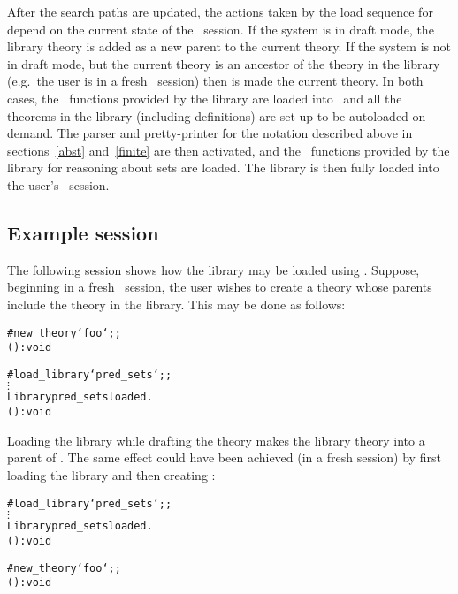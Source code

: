 After the search paths are updated, the actions taken by the load sequence for
 depend on the current state of the \HOL\ session. If the system
is in draft mode, the library theory  is added as a new parent
to the current theory.  If the system is not in draft mode, but the current
theory is an ancestor of the  theory in the library (e.g.\ the
user is in a fresh \HOL\ session) then  is made the current
theory.  In both cases, the \ML\ functions provided by the library are loaded
into \HOL\, and all the theorems in the library (including definitions) are set
up to be autoloaded on demand.  The parser and pretty-printer for the notation
described above in sections~\ref{abst} and~\ref{finite} are then activated, and
the \ML\ functions provided by the library for reasoning about sets are loaded.
The  library is then fully loaded into the user's \HOL\ session.

\subsection{Example session}

The following session shows how the  library may be loaded using
. Suppose, beginning in a fresh \HOL\ session, the user
wishes to create a theory  whose parents include the theory
 in the library. This may be done as follows:

\setcounter{sessioncount}{1}
\begin{session}\begin{alltt}
#new_theory `foo`;;
() : void

#load_library `pred_sets`;;
  \(\vdots\)
Library pred_sets loaded.
() : void
\end{alltt}\end{session}

\noindent Loading the library while drafting the theory  makes the
library theory  into a parent of .  The same effect
could have been achieved (in a fresh session) by first loading the library and
then creating :

\setcounter{sessioncount}{1}
\begin{session}\begin{alltt}
#load_library `pred_sets`;;
  \(\vdots\)
Library pred_sets loaded.
() : void

#new_theory `foo`;;
() : void
\end{alltt}\end{session}

